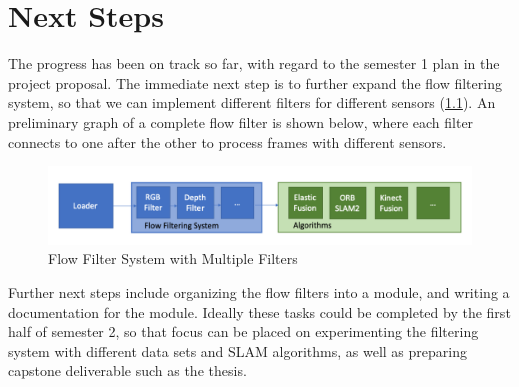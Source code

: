 
\chapter{Next Steps} %

\label{Chapter4} %

The progress has been on track so far, with regard to the semester 1 plan in the project proposal. The immediate next step is to further expand the flow filtering system, so that we can implement different  filters for different sensors (\ref{fig:flowfiltermul}). An preliminary graph of a complete flow filter is shown below, where each filter connects to one after the other to process frames with different sensors. 

\begin{figure}[!htbp]
	\caption{\label{fig:flowfiltermul}Flow Filter System with Multiple Filters}
	\includegraphics[width=14cm]{figures/flow-filter-complex.png}
	\centering
\end{figure}

Further next steps include organizing the flow filters into a module, and writing a documentation for the module. Ideally these tasks could be completed by the first half of semester 2, so that focus can be placed on experimenting the filtering system with different data sets and SLAM algorithms, as well as preparing capstone deliverable such as the thesis.